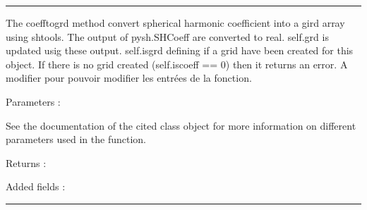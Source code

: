 \documentclass[letterpaper,10pt,english]{sphinxmanual}
\begin{document}
\bigskip\hrule\bigskip


\begin{fulllineitems}
\label{\detokenize{spharm_doc:SL_C0de.spharm.sphericalobject.coefftogrd}}
\pysigstartsignatures
{}
\pysigstopsignatures
\sphinxAtStartPar
The \label{\detokenize{spharm_doc:coefftogrd}}coefftogrd method convert spherical harmonic coefficient into a gird array using shtools.
The output of pysh.SHCoeff are converted to real.
self.grd is updated usig these output.
self.isgrd defining if a grid have been created for this object. 
If there is no grid created (self.iscoeff == 0) then it returns an error.
A modifier pour pouvoir modifier les entrées de la fonction.

\sphinxAtStartPar
Parameters :

\sphinxAtStartPar
See the documentation of the cited class object for more information on different parameters used in the function.

\sphinxAtStartPar
Returns :

\sphinxAtStartPar
Added fields :

\end{fulllineitems}



\bigskip\hrule\bigskip

\end{document}
